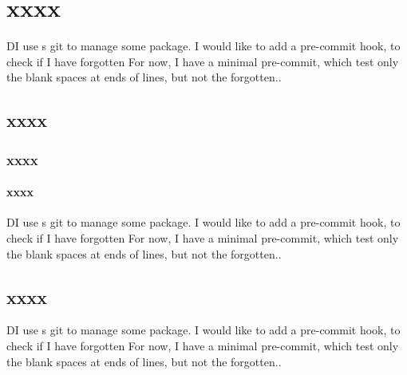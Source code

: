 \documentclass[a4paper, oneside, 12pt]{book}
\begin{document}
\endnumbering
\newpage

\chapter{xxxx}
DI use s git to manage some package.
I would like to add a pre-commit hook, to check if I have forgotten
For now, I have a minimal pre-commit, which test only the blank spaces at ends of lines, but not the forgotten..
\section{xxxx}
\subsection{xxxx}
\subsubsection{xxxx}
DI use s git to manage some package.
I would like to add a pre-commit hook, to check if I have forgotten
For now, I have a minimal pre-commit, which test only the blank spaces at ends of lines, but not the forgotten..
\section{xxxx}

DI use s git to manage some package.
I would like to add a pre-commit hook, to check if I have forgotten
For now, I have a minimal pre-commit, which test only the blank spaces at ends of lines, but not the forgotten..
\end{document}
